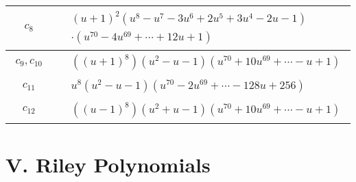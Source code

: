 \documentclass[1p]{elsarticle_modified}
\theoremstyle{definition}
\begin{document}
\begin{tabular}{m{50pt}|m{274pt}}
\hline $$\begin{aligned}c_{8}\end{aligned}$$&$\begin{aligned}
&(u+1)^2(u^8- u^7-3 u^6+2 u^5+3 u^4-2 u-1)\\
&\cdot(u^{70}-4 u^{69}+\cdots+12 u+1)
\end{aligned}$\\
\hline $$\begin{aligned}c_{9},c_{10}\end{aligned}$$&$\begin{aligned}
&((u+1)^8)(u^2- u-1)(u^{70}+10 u^{69}+\cdots- u+1)
\end{aligned}$\\
\hline $$\begin{aligned}c_{11}\end{aligned}$$&$\begin{aligned}
&u^8(u^2- u-1)(u^{70}-2 u^{69}+\cdots-128 u+256)
\end{aligned}$\\
\hline $$\begin{aligned}c_{12}\end{aligned}$$&$\begin{aligned}
&((u-1)^8)(u^2+u-1)(u^{70}+10 u^{69}+\cdots- u+1)
\end{aligned}$\\
\hline
\end{tabular}\newpage\renewcommand{\arraystretch}{1}
\centering \section*{ V. Riley Polynomials}
\end{document}
